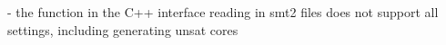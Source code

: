 
- the function in the C++ interface reading in smt2 files does not support all settings, including generating unsat cores